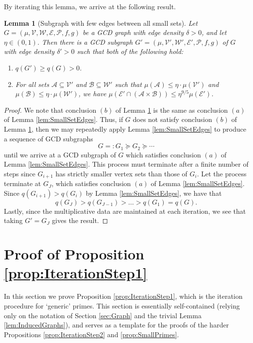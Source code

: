 \documentclass[12pt]{amsart}
\numberwithin{equation}{section}
\newtheorem{lem}{Lemma}[section]
\theoremstyle{definition}
\theoremstyle{remark}
\newcommand{\CA}{\mathcal{A}}
\newcommand{\CB}{\mathcal{B}}
\newcommand{\CE}{\mathcal{E}}
\newcommand{\CP}{\mathcal{P}}
\newcommand{\CV}{\mathcal{V}}
\newcommand{\CW}{\mathcal{W}}
\renewcommand{\le}{\leqslant}
\renewcommand{\ge}{\geqslant}
\begin{document}
By iterating this lemma, we arrive at the following result.

\begin{lem}[Subgraph with few edges between all small sets]\label{lem:NoSmallSetEdges}
		Let	$G=(\mu,\CV,\CW,\CE,\CP,f,g)$ be a GCD graph with edge density $\delta>0$, and let $\eta\in(0,1)$. Then there is a GCD subgraph $G'=(\mu,\CV',\CW',\CE',\CP,f,g)$ of $G$ with edge density $\delta'>0$ such that both of the following hold:
		\begin{enumerate}
			\item$q(G')\ge q(G)>0$.
			\item For all sets $\CA\subseteq\CV'$ and $\CB\subseteq\CW'$ such that $\mu(\CA)\le \eta\cdot \mu(\CV')$ and $\mu(\CB)\le \eta\cdot \mu(\CW')$, we have $\mu(\CE'\cap(\CA\times\CB))\le \eta^{9/5}\mu(\CE')$.
		\end{enumerate}
\end{lem}

\begin{proof} 
We note that conclusion $(b)$ of Lemma \ref{lem:NoSmallSetEdges} is the same as conclusion $(a)$ of Lemma \ref{lem:SmallSetEdges}. Thus, if $G$ does not satisfy conclusion $(b)$ of Lemma \ref{lem:NoSmallSetEdges}, then we may repeatedly apply Lemma \ref{lem:SmallSetEdges} to produce a sequence of GCD subgraphs 
	\[
	G=:G_1\succeq G_2\succeq\cdots 
	\]
	until we arrive at a GCD subgraph of $G$ which satisfies conclusion $(a)$ of Lemma \ref{lem:SmallSetEdges}. This process must terminate after a finite number of steps since $G_{i+1}$ has strictly smaller vertex sets than those of $G_i$. Let the process terminate at $G_J$, which satisfies conclusion $(a)$ of Lemma \ref{lem:SmallSetEdges}. Since $q(G_{i+1})>q(G_i)$ by Lemma \ref{lem:SmallSetEdges}, we have that 
	\[
	q(G_J)>q(G_{J-1})>\dots>q(G_1)=q(G).
	\]
	Lastly, since the multiplicative data are maintained at each iteration, we see that taking $G'=G_J$ gives the result.
\end{proof}

\section{Proof of Proposition \ref{prop:IterationStep1}} \label{sec:IterationStep1}

In this section we prove Proposition \ref{prop:IterationStep1}, which is the iteration procedure for `generic' primes. This section is essentially self-contained (relying only on the notation of Section \ref{sec:Graph} and the trivial Lemma \ref{lem:InducedGraphs}), and serves as a template for the proofs of the harder Propositions \ref{prop:IterationStep2} and \ref{prop:SmallPrimes}.
\end{document}
